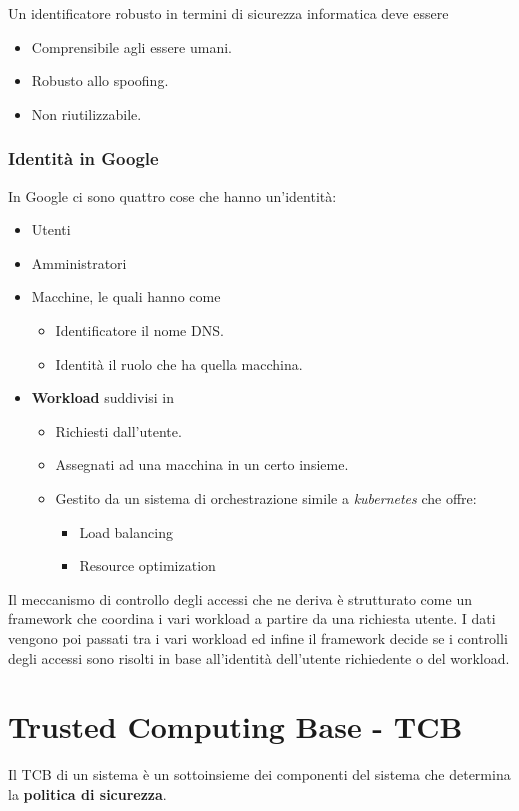 Un identificatore robusto in termini di sicurezza informatica deve essere
\begin{itemize}
	\item Comprensibile agli essere umani.
	\item Robusto allo spoofing.
	\item Non riutilizzabile.
\end{itemize}

\subsubsection{Identità in Google}
In Google ci sono quattro cose che hanno un'identità:
\begin{itemize}
	\item Utenti
	\item Amministratori
	\item Macchine, le quali hanno come
	      \begin{itemize}
		      \item Identificatore il nome DNS.
		      \item Identità il ruolo che ha quella macchina.
	      \end{itemize}
	\item \textbf{Workload} suddivisi in
	      \begin{itemize}
		      \item Richiesti dall'utente.
		      \item Assegnati ad una macchina in un certo insieme.
		      \item Gestito da un sistema di orchestrazione simile a \emph{kubernetes} che offre:
		            \begin{itemize}
			            \item Load balancing
			            \item Resource optimization
		            \end{itemize}
	      \end{itemize}
\end{itemize}
Il meccanismo di controllo degli accessi che ne deriva è strutturato come un framework che coordina i vari workload
a partire da una richiesta utente. I dati vengono poi passati tra i vari workload ed infine il framework decide se
i controlli degli accessi sono risolti in base all'identità dell'utente richiedente o del workload.

\section{Trusted Computing Base - TCB}
Il TCB di un sistema è un sottoinsieme dei componenti del sistema che determina la \textbf{politica di sicurezza}.

